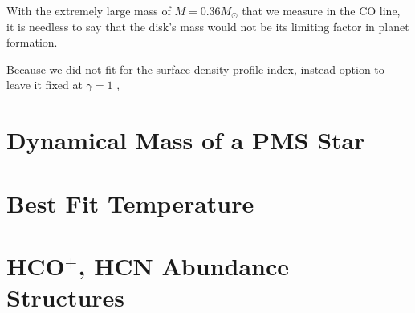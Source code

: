 With the extremely large mass of $M = 0.36M_\odot$ that we measure in the CO line, it is needless to say that the disk's mass would not be its limiting factor in planet formation.


Because we did not fit for the surface density profile index, instead option to leave it fixed at $\gamma=1$ \citep{Andrews2009},

\section{Dynamical Mass of a PMS Star}
\label{section:fitting_procedure}




\section{Best Fit Temperature }
\label{section:fitting_procedure}








\section{HCO$^+$, HCN Abundance Structures}
\label{section:fitting_procedure}

